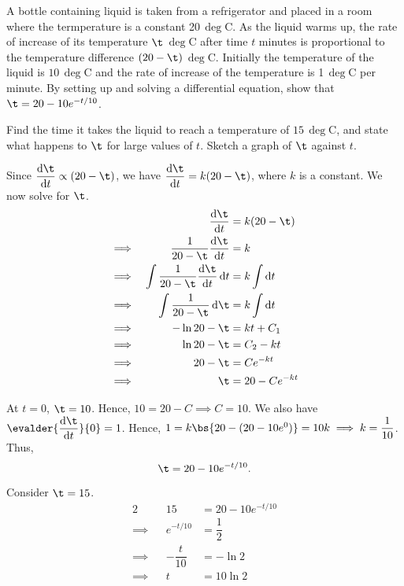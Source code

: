 \documentclass{echw}
\begin{document}
    \problem{}
        A bottle containing liquid is taken from a refrigerator and placed in a room where the termperature is a constant 20\,$\deg$C. As the liquid warms up, the rate of increase of its temperature $\t$\,$\deg$C after time $t$ minutes is proportional to the temperature difference $(20-\t)$\,$\deg$C. Initially the temperature of the liquid is $10$\,$\deg$C and the rate of increase of the temperature is 1\,$\deg$C per minute. By setting up and solving a differential equation, show that $\t = 20 - 10e^{-t/10}$.

        Find the time it takes the liquid to reach a temperature of $15$\,$\deg$C, and state what happens to $\t$ for large values of $t$. Sketch a graph of $\t$ against $t$.
    
    \solution
        Since $\der{\t}{t} \propto (20 - \t)$, we have $\der{\t}{t} = k(20 - \t)$, where $k$ is a constant. We now solve for $\t$.
        \begin{alignat*}{2}
            &&\der{\t}{t} &= k(20 - \t)\\
            \implies&& \dfrac1{20 - \t} \der{\t}{t} &= k\\
            \implies&& \int \dfrac1{20 - \t} \der{\t}{t} \d t &= k \int \d t\\
            \implies&& \int \dfrac1{20 - \t} \d \t &= k \int \d t\\
            \implies&& - \ln{20 - \t} &= kt + C_1\\
            \implies&& \ln{20-\t} &= C_2 - kt\\
            \implies&& 20 - \t &= C e^{-kt}\\
            \implies&& \t &= 20 - Ce^{-kt}
        \end{alignat*}

        At $t = 0$, $\t = 10$. Hence, $10 = 20 - C \implies C = 10$. We also have $\evalder{\der{\t}{t}}{0} = 1$. Hence, $1 = k\bs{20 - (20 - 10e^0)} = 10k \implies k = \dfrac1{10}$. Thus, \[\t = 20 - 10e^{-t/10}.\]

        Consider $\t = 15$.
        \begin{alignat*}{2}
            && 15 &= 20 - 10e^{-t/10}\\
            \implies&& e^{-t/10} &= \dfrac12\\
            \implies&& -\dfrac{t}{10} &= -\ln 2\\
            \implies&& t &= 10\ln 2
        \end{alignat*}
\end{document}
